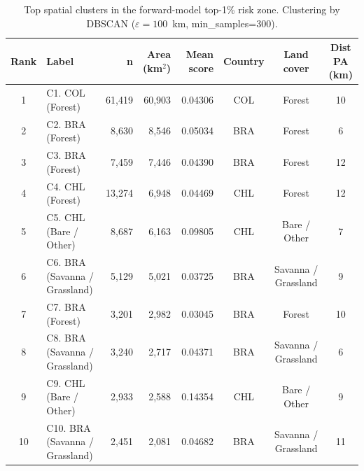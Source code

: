 \begin{table}[htbp]
  \centering
  \small
  \caption{Top spatial clusters in the forward-model top-1\% risk zone.
   Clustering by DBSCAN ($\varepsilon=100$~km, min\_samples=300).}
  \label{tab:spatial_clusters}
  \begin{tabular}{clrrrccc}
    \toprule
    Rank & Label & n & Area (km$^2$) & Mean score & Country & Land cover & Dist PA (km) \\
    \midrule
    1 & C1. COL (Forest) & 61,419 & 60,903 & 0.04306 & COL & Forest & 10 \\
    2 & C2. BRA (Forest) & 8,630 & 8,546 & 0.05034 & BRA & Forest & 6 \\
    3 & C3. BRA (Forest) & 7,459 & 7,446 & 0.04390 & BRA & Forest & 12 \\
    4 & C4. CHL (Forest) & 13,274 & 6,948 & 0.04469 & CHL & Forest & 12 \\
    5 & C5. CHL (Bare / Other) & 8,687 & 6,163 & 0.09805 & CHL & Bare / Other & 7 \\
    6 & C6. BRA (Savanna / Grassland) & 5,129 & 5,021 & 0.03725 & BRA & Savanna / Grassland & 9 \\
    7 & C7. BRA (Forest) & 3,201 & 2,982 & 0.03045 & BRA & Forest & 10 \\
    8 & C8. BRA (Savanna / Grassland) & 3,240 & 2,717 & 0.04371 & BRA & Savanna / Grassland & 6 \\
    9 & C9. CHL (Bare / Other) & 2,933 & 2,588 & 0.14354 & CHL & Bare / Other & 9 \\
    10 & C10. BRA (Savanna / Grassland) & 2,451 & 2,081 & 0.04682 & BRA & Savanna / Grassland & 11 \\
    \bottomrule
  \end{tabular}
\end{table}

